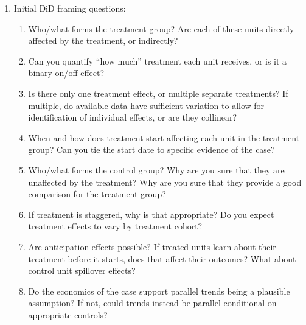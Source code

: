 \documentclass[12pt]{article}
\begin{document}
\begin{enumerate}
    \item Initial DiD framing questions:
    \begin{enumerate}
        \item Who/what forms the treatment group? Are each of these units directly affected by the treatment, or indirectly? 
        \item Can you quantify ``how much'' treatment each unit receives, or is it a binary on/off effect?
        \item Is there only one treatment effect, or multiple separate treatments? If multiple, do available data have sufficient variation to allow for identification of individual effects, or are they collinear? 
        \item When and how does treatment start affecting each unit in the treatment group? Can you tie the start date to specific evidence of the case?
        \item Who/what forms the control group? Why are you sure that they are unaffected by the treatment? Why are you sure that they provide a good comparison for the treatment group?
        \item If treatment is staggered, why is that appropriate? Do you expect treatment effects to vary by treatment cohort?
        \item Are anticipation effects possible? If treated units learn about their treatment before it starts, does that affect their outcomes? What about control unit spillover effects?
        \item Do the economics of the case support parallel trends being a plausible assumption? If not, could trends instead be parallel conditional on appropriate controls? 
    \end{enumerate}


\end{enumerate}
\end{document}
